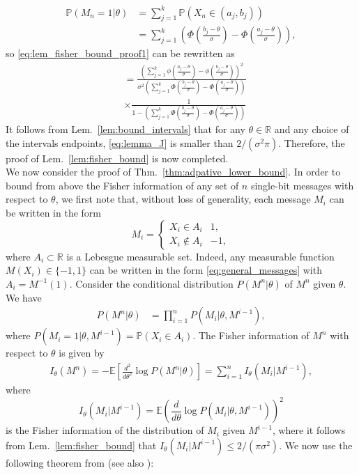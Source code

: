 \documentclass[letterpaper, conference,9pt]{IEEEtran}      %
\begin{document}
\begin{align*}
\mathbb P(M_n=1| \theta) & = \sum_{j=1}^k \mathbb P\left(X_n \in (a_j,b_j) \right)  \\
& = \sum_{j=1}^k \left( \Phi \left(\frac{b_j-\theta}{\sigma} \right) -  \Phi \left(\frac{a_j-\theta}{\sigma} \right)  \right),
\end{align*}
so \eqref{eq:lem_fisher_bound_proof1} can be rewritten as
\begin{align}
& =   \frac { \left( \sum_{j=1}^{k} \phi \left(\frac{a_j-\theta}{\sigma} \right) - \phi \left( \frac{b_j-\theta} {\sigma} \right)  \right)^2 } 
{\sigma^2 \left( \sum_{j=1}^k \Phi \left( \frac{b_j-\theta }{\sigma}\right) - \Phi \left( \frac{a_j-\theta }{\sigma}\right)  \right) }  \nonumber \\
& \times \frac {1} 
{1- \left( \sum_{j=1}^k \Phi \left( \frac{b_j-\theta }{\sigma}\right) - \Phi \left( \frac{a_j-\theta }{\sigma}\right)  \right) } 
\label{eq:lemma_J}
\end{align}
It follows from Lem.~\ref{lem:bound_intervals} that for any $\theta \in \mathbb R$ and any choice of the intervals endpoints, \eqref{eq:lemma_J} is smaller than $2/(\sigma^2 \pi)$. Therefore, the proof of  Lem.~\ref{lem:fisher_bound} is now completed.
 \\

We now consider the proof of Thm.~\ref{thm:adpative_lower_bound}. In order to bound from above the Fisher information of any set of $n$ single-bit messages with respect to $\theta$, we first note that, without loss of generality, each message $M_i$ can be written in the form
\begin{equation}
\label{eq:general_messages}
M_i = \begin{cases}
X_i \in A_i & 1, \\
X_i \notin A_i & -1,
\end{cases} 
\end{equation}
where $A_i \subset \mathbb R$ is a Lebesgue measurable set. Indeed, any measurable function $M(X_i) \in \{-1,1\}$ can be written in the form \eqref{eq:general_messages} with $A_i = M^{-1}(1)$. Consider the conditional distribution $P({M^n|\theta})$ of $M^n$ given $\theta$. We have 
\begin{align}
P\left( M^n | \theta \right) & =  \prod_{i=1}^n P\left(M_i | \theta, M^{i-1} \right), \label{eq:adpt_lower_bound_proof:1}
\end{align}
where $P\left(M_i =1 | \theta, M^{i-1}  \right) = \mathbb P\left( X_i \in A_i\right)$. The Fisher information of $M^n$ with respect to $\theta$ is given by 
\begin{align}
I_\theta(M^n) = -\mathbb E \left[ \frac{d^2}{d\theta^2} \log P(M^n | \theta) \right] = \sum_{i=1}^n I_\theta (M_i|M^{i-1}),
\label{eq:fisher_information}
\end{align}
where 
\[
I_\theta (M_i|M^{i-1}) = \mathbb E \left( \frac{d}{d\theta} \log P(M_i | \theta, M^{i-1}) \right)^2
\]
 is the Fisher information of the distribution of $M_i$ given $M^{i-1}$, where it follows from Lem.~\ref{lem:fisher_bound} that $I_\theta (M_i|M^{i-1}) \leq 2/(\pi \sigma^2)$. We now use the following theorem from \cite[Thm. 2.13]{tsybakov2008introduction} (see also \cite{van2004detection, gill1995applications}):
\end{document}

